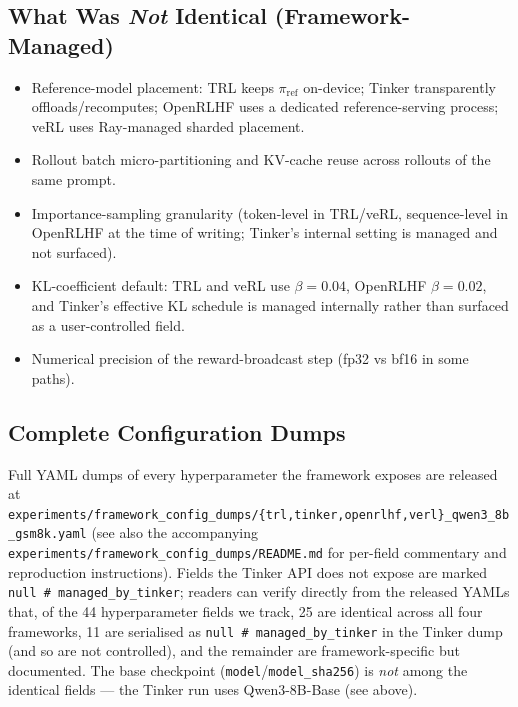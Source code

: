 \subsection{What Was \emph{Not} Identical (Framework-Managed)}

\begin{itemize}[leftmargin=1.2em,itemsep=1pt]
  \item Reference-model placement: TRL keeps $\pi_\text{ref}$ on-device;
        Tinker transparently offloads/recomputes; OpenRLHF uses a
        dedicated reference-serving process; veRL uses Ray-managed
        sharded placement.
  \item Rollout batch micro-partitioning and KV-cache reuse across
        rollouts of the same prompt.
  \item Importance-sampling granularity (token-level in TRL/veRL,
        sequence-level in OpenRLHF at the time of writing; Tinker's
        internal setting is managed and not surfaced).
  \item KL-coefficient default: TRL and veRL use $\beta=0.04$,
        OpenRLHF $\beta=0.02$, and Tinker's effective KL schedule is
        managed internally rather than surfaced as a user-controlled field.
  \item Numerical precision of the reward-broadcast step (fp32 vs
        bf16 in some paths).
\end{itemize}

\subsection{Complete Configuration Dumps}

Full YAML dumps of every hyperparameter the framework exposes are
released at
\texttt{experiments/framework\_config\_dumps/\{trl,tinker,openrlhf,verl\}\_qwen3\_8b\_gsm8k.yaml}
(see also the accompanying
\texttt{experiments/framework\_config\_dumps/README.md} for per-field
commentary and reproduction instructions).
Fields the Tinker API does not expose are marked
\texttt{null\ \#\ managed\_by\_tinker}; readers can verify directly from the
released YAMLs that, of the 44 hyperparameter fields we track, 25 are identical
across all four frameworks, 11 are serialised as
\texttt{null\ \#\ managed\_by\_tinker} in the Tinker dump (and so are not
controlled), and the remainder are framework-specific but documented. The base
checkpoint (\texttt{model}/\texttt{model\_sha256}) is \emph{not} among the
identical fields --- the Tinker run uses Qwen3-8B-Base (see above).

